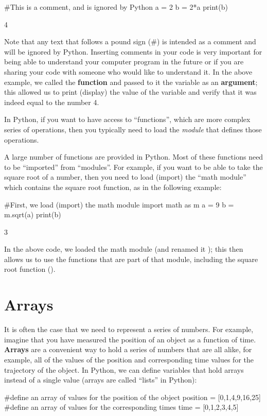 \begin{python}[caption=Declaring variables in Python] 
#This is a comment, and is ignored by Python
a = 2 
b = 2*a
print(b)
\end{python}
\begin{poutput}
4
\end{poutput}
Note that any text that follows a pound sign (\#) is intended as a comment and will be ignored by Python. Inserting comments in your code is very important for being able to understand your computer program in the future or if you are sharing your code with someone who would like to understand it. In the above example, we called the  \textbf{function} and passed to it the variable  as an \textbf{argument}; this allowed us to print (display) the value of the variable  and verify that it was indeed equal to the number 4.


In Python, if you want to have access to ``functions'', which are more complex series of operations, then you typically need to load the \textit{module} that defines those operations. 

A large number of functions are provided in Python. Most of these functions need to be ``imported'' from ``modules''. For example, if you want to be able to take the square root of a number, then you need to load (import) the ``math module'' which contains the square root function, as in the following example:
\begin{python}[caption=Using functions from modules] 
#First, we load (import) the math module
import math as m
a = 9
b = m.sqrt(a)
print(b)
\end{python}
\begin{poutput}
3
\end{poutput}
In the above code, we loaded the math module (and renamed it ); this then allows us to use the functions that are part of that module, including the square root function ().

\section{Arrays}
It is often the case that we need to represent a series of numbers. For example, imagine that you have measured the position of an object as a function of time. \textbf{Arrays} are a convenient way to hold a series of numbers that are all alike, for example, all of the values of the position and corresponding time values for the trajectory of the object. In Python, we can define variables that hold arrays instead of a single value (arrays are called ``lists'' in Python):
\begin{python}[caption=Arrays in python]
#define an array of values for the position of the object
position = [0,1,4,9,16,25]
#define an array of values for the corresponding times
time = [0,1,2,3,4,5]
\end{python}

